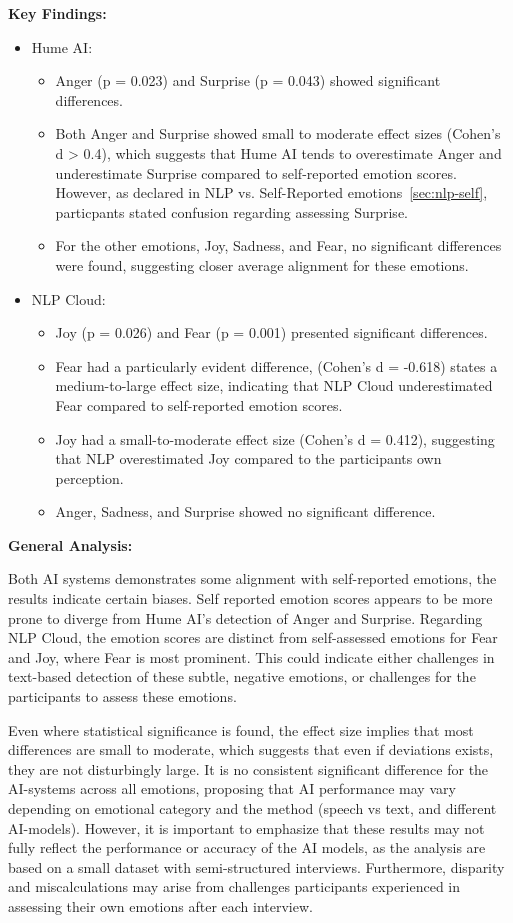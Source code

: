 \textbf{Key Findings:}
\begin{itemize}
    \item Hume AI: 
    \begin{itemize}
        \item Anger (p = 0.023) and Surprise (p = 0.043) showed significant differences. 
        \item Both Anger and Surprise showed small to moderate effect sizes (Cohen's d > 0.4), which suggests that Hume AI tends to overestimate Anger and underestimate Surprise compared to self-reported emotion scores. However, as declared in NLP vs. Self-Reported emotions~\ref{sec:nlp-self}, particpants stated confusion regarding assessing Surprise.
        \item For the other emotions, Joy, Sadness, and Fear, no significant differences were found, suggesting closer average alignment for these emotions.
    \end{itemize}
    \item NLP Cloud: 
    \begin{itemize}
        \item Joy (p = 0.026) and Fear (p = 0.001) presented significant differences. 
        \item Fear had a particularly evident difference, (Cohen's d = -0.618) states a medium-to-large effect size, indicating that NLP Cloud underestimated Fear compared to self-reported emotion scores. 
        \item Joy had a small-to-moderate effect size (Cohen's d = 0.412), suggesting that NLP overestimated Joy compared to the participants own perception. 
        \item Anger, Sadness, and Surprise showed no significant difference. 
    \end{itemize}
\end{itemize}
\textbf{General Analysis:}

Both AI systems demonstrates some alignment with self-reported emotions, the results indicate certain biases. Self reported emotion scores appears to be more prone to diverge from Hume AI's detection of Anger and Surprise. 
Regarding NLP Cloud, the emotion scores are distinct from self-assessed emotions for Fear and Joy, where Fear is most prominent. This could indicate either challenges in text-based detection of these subtle, negative emotions, 
or challenges for the participants to assess these emotions. 

Even where statistical significance is found, the effect size implies that most differences are small to moderate, which 
suggests that even if deviations exists, they are not disturbingly large. It is no consistent significant difference for the AI-systems across all emotions, proposing that AI performance may vary depending on emotional category and the method (speech vs text, and different AI-models).
However, it is important to emphasize that these results may not fully reflect the performance or accuracy of the
AI models, as the analysis are based on a small dataset with semi-structured interviews. Furthermore, disparity and miscalculations may arise from challenges participants experienced in assessing their own emotions after each interview. 

